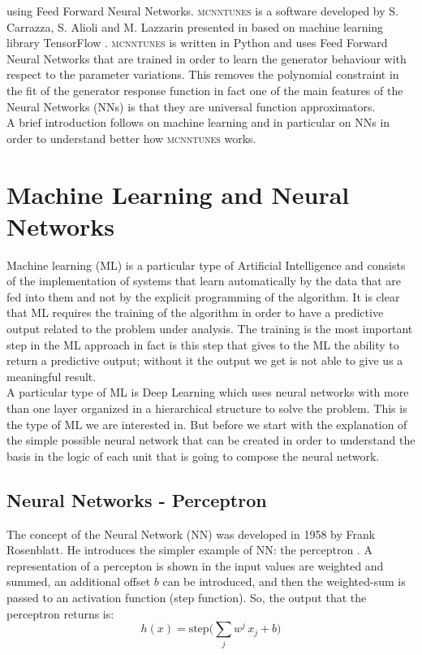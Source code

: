 using Feed Forward Neural Networks. \textsc{mcnntunes} is a software developed by S. Carrazza, S. Alioli and M. Lazzarin presented in \cite{MCNNTUNESarticle} based on machine learning library TensorFlow \cite{tensorflow2015-whitepaper}. \textsc{mcnntunes} is written in Python and uses Feed Forward Neural Networks that are trained in order to learn the generator behaviour with respect to the parameter variations. This removes the polynomial constraint in the fit of the generator response function in fact one of the main features of the Neural Networks (NNs) is that they are universal function approximators.
\\
A brief introduction follows on machine learning and in particular on NNs in order to understand better how \textsc{mcnntunes} works.

\section{Machine Learning and Neural Networks}
  
Machine learning (ML) is a particular type of Artificial Intelligence and consists of the implementation of systems that learn automatically by the data that are fed into them and not by the explicit programming of the algorithm. It is clear that ML requires the training of the algorithm in order to have a predictive output related to the problem under analysis. The training is the most important step in the ML approach in fact is this step that gives to the ML the ability to return a predictive output; without it the output we get is not able to give us a meaningful result.
\\
A particular type of ML is Deep Learning which uses neural networks with more than one layer organized in a hierarchical structure to solve the problem. This is the type of ML we are interested in. But before we start with the explanation of the simple possible neural network that can be created in order to understand the basis in the logic of each unit that is going to compose the neural network. 


\subsection{Neural Networks - Perceptron}

The concept of the Neural Network (NN) was developed in 1958 by Frank Rosenblatt. He introduces the simpler example of NN: the perceptron \cite{Perceptron}. A representation of a percepton is shown in  the input values are weighted and summed, an additional offset $b$ can be introduced, and then the weighted-sum is passed to an activation function (step function). So, the output that the perceptron returns is:
\begin{equation}
	h(x)= \text{step}\bigg(\displaystyle\sum_j w^j\, x_j + b\bigg)
\end{equation}


